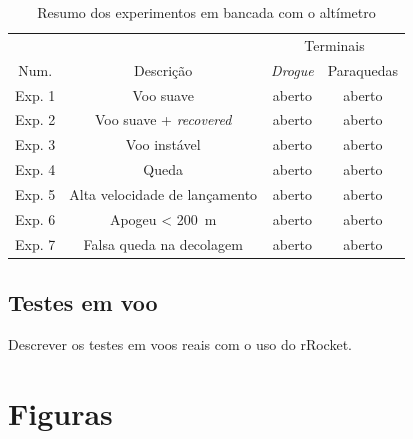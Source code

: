 \documentclass[12pt,a4paper]{article}
\begin{document}
\begin{table}[!ht]
	\centering
	\caption{Resumo dos experimentos em bancada com o altímetro}
	\begin{tabular}{cccc}
		\toprule
		&&\multicolumn{2}{c}{Terminais}\\\cmidrule{3-4}
		Num.&Descrição&\textit{Drogue}&Paraquedas\\
		\midrule
		Exp. 1 & Voo suave &  aberto&   aberto\\
		Exp. 2 & Voo suave + \textit{recovered} &  aberto&   aberto\\
		Exp. 3 & Voo instável &  aberto&   aberto\\
		Exp. 4 & Queda &   aberto& aberto\\
		Exp. 5 & Alta velocidade de lançamento&  aberto&   aberto\\
		Exp. 6 & Apogeu < 200~m&  aberto&   aberto\\
		Exp. 7 & Falsa queda na decolagem &  aberto&   aberto\\
		\bottomrule
	\end{tabular}
	\label{tab:experimentation}
\end{table}

\subsection{Testes em voo}

Descrever os testes em voos reais com o uso do rRocket.


\pagebreak
\newpage
\appendix

\section{Figuras}
\end{document}
